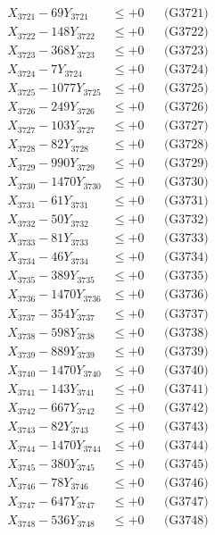 \documentclass[a4paper,10pt]{article}
\begin{document}
{\begin{align}
\allowbreak
X_{3721} - 69Y_{3721} &\leq +0 && \text{(G3721)} \\
X_{3722} - 148Y_{3722} &\leq +0 && \text{(G3722)} \\
X_{3723} - 368Y_{3723} &\leq +0 && \text{(G3723)} \\
X_{3724} - 7Y_{3724} &\leq +0 && \text{(G3724)} \\
X_{3725} - 1077Y_{3725} &\leq +0 && \text{(G3725)} \\
X_{3726} - 249Y_{3726} &\leq +0 && \text{(G3726)} \\
X_{3727} - 103Y_{3727} &\leq +0 && \text{(G3727)} \\
X_{3728} - 82Y_{3728} &\leq +0 && \text{(G3728)} \\
X_{3729} - 990Y_{3729} &\leq +0 && \text{(G3729)} \\
X_{3730} - 1470Y_{3730} &\leq +0 && \text{(G3730)} \\
\allowbreak
X_{3731} - 61Y_{3731} &\leq +0 && \text{(G3731)} \\
X_{3732} - 50Y_{3732} &\leq +0 && \text{(G3732)} \\
X_{3733} - 81Y_{3733} &\leq +0 && \text{(G3733)} \\
X_{3734} - 46Y_{3734} &\leq +0 && \text{(G3734)} \\
X_{3735} - 389Y_{3735} &\leq +0 && \text{(G3735)} \\
X_{3736} - 1470Y_{3736} &\leq +0 && \text{(G3736)} \\
X_{3737} - 354Y_{3737} &\leq +0 && \text{(G3737)} \\
X_{3738} - 598Y_{3738} &\leq +0 && \text{(G3738)} \\
X_{3739} - 889Y_{3739} &\leq +0 && \text{(G3739)} \\
X_{3740} - 1470Y_{3740} &\leq +0 && \text{(G3740)} \\
\allowbreak
X_{3741} - 143Y_{3741} &\leq +0 && \text{(G3741)} \\
X_{3742} - 667Y_{3742} &\leq +0 && \text{(G3742)} \\
X_{3743} - 82Y_{3743} &\leq +0 && \text{(G3743)} \\
X_{3744} - 1470Y_{3744} &\leq +0 && \text{(G3744)} \\
X_{3745} - 380Y_{3745} &\leq +0 && \text{(G3745)} \\
X_{3746} - 78Y_{3746} &\leq +0 && \text{(G3746)} \\
X_{3747} - 647Y_{3747} &\leq +0 && \text{(G3747)} \\
X_{3748} - 536Y_{3748} &\leq +0 && \text{(G3748)} \\

\end{align}}
\end{document}
